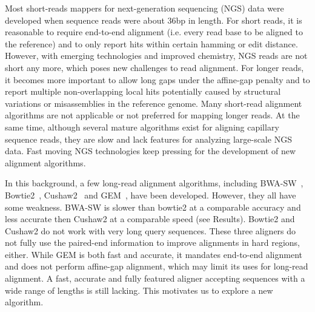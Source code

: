 \documentclass{bioinfo}
\begin{document}
Most short-reads mappers for next-generation sequencing (NGS) data were developed
when sequence reads were about 36bp in length. For short reads, it is reasonable
to require end-to-end alignment (i.e. every read base to be aligned to the
reference) and to only report hits within certain hamming or edit distance.
However, with emerging technologies and improved chemistry, NGS reads are not
short any more, which poses new challenges to read alignment. For longer reads,
it becomes more important to allow long gaps under the affine-gap penalty and
to report multiple non-overlapping local hits potentially caused by structural
variations or misassemblies in the reference genome. Many short-read alignment
algorithms are not applicable or not preferred for mapping longer reads. At the
same time, although several mature algorithms exist for aligning capillary
sequence reads, they are slow and lack features for analyzing large-scale NGS
data. Fast moving NGS technologies keep pressing for the development of new
alignment algorithms.

In this background, a few long-read alignment algorithms, including BWA-SW~\citep{Li:2010fk},
Bowtie2~\citep{Langmead:2012fk}, Cushaw2~\citep{Liu:2012uq} and GEM~\citep{Marco-Sola:2012kx}, have been developed. However, they all have some
weakness. BWA-SW is slower than bowtie2 at a comparable accuracy and less
accurate then Cushaw2 at a comparable speed (see Results). Bowtie2 and Cushaw2
do not work with very long query sequences. These three aligners do not fully
use the paired-end information to improve alignments in hard regions, either.
While GEM is both fast and accurate, it mandates end-to-end alignment and does
not perform affine-gap alignment, which may limit its uses for long-read
alignment. A fast, accurate and fully featured aligner accepting sequences
with a wide range of lengths is still lacking. This motivates us to explore
a new algorithm.
\end{document}
